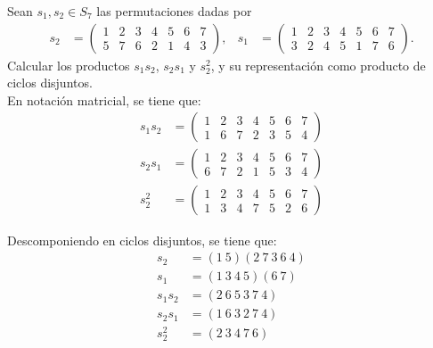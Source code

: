 \begin{ejercicio}\label{ej:2.14}
    Sean $s_1, s_2 \in S_7$ las permutaciones dadas por
    \begin{align*}
        s_2 &= \begin{pmatrix} 1 & 2 & 3 & 4 & 5 & 6 & 7 \\ 5 & 7 & 6 & 2 & 1 & 4 & 3 \end{pmatrix}, &
        s_1 &= \begin{pmatrix} 1 & 2 & 3 & 4 & 5 & 6 & 7 \\ 3 & 2 & 4 & 5 & 1 & 7 & 6 \end{pmatrix}.
    \end{align*}
    Calcular los productos $s_1s_2$, $s_2s_1$ y $s_2^2$, y su representación como producto de ciclos disjuntos.\\

    En notación matricial, se tiene que:
    \begin{align*}
        s_1s_2 &= \begin{pmatrix} 1 & 2 & 3 & 4 & 5 & 6 & 7 \\ 1 & 6 & 7 & 2 & 3 & 5 & 4 \end{pmatrix}\\
        s_2s_1 &= \begin{pmatrix} 1 & 2 & 3 & 4 & 5 & 6 & 7 \\ 6 & 7 & 2 & 1 & 5 & 3 & 4 \end{pmatrix}\\
        s_2^2 &= \begin{pmatrix} 1 & 2 & 3 & 4 & 5 & 6 & 7 \\ 1 & 3 & 4 & 7 & 5 & 2 & 6 \end{pmatrix}
    \end{align*}

    Descomponiendo en ciclos disjuntos, se tiene que:
    \begin{align*}
        s_2 &= (1\ 5)(2\ 7\ 3\ 6\ 4)\\
        s_1 &= (1\ 3\ 4\ 5)(6\ 7)\\
        s_1s_2 &= (2\ 6\ 5\ 3\ 7\ 4)\\
        s_2s_1 &= (1\ 6\ 3\ 2\ 7\ 4)\\
        s_2^2 &= (2\ 3\ 4\ 7\ 6)
    \end{align*}
\end{ejercicio}

